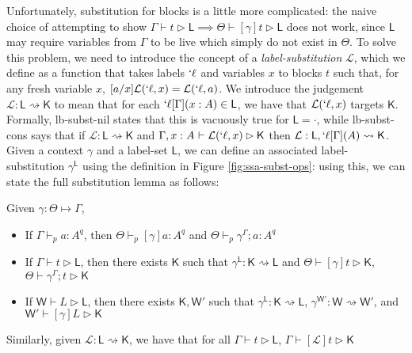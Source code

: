 \documentclass[acmsmall,screen,review]{acmart}
\newcommand{\mc}[1]{\ensuremath{\mathcal{#1}}}
\newcommand{\ms}[1]{\ensuremath{\mathsf{#1}}}
\newcommand{\lbl}[1]{{`#1}}
\newcommand{\thyp}[3]{#1: {#2}^{#3}}
\newcommand{\lhyp}[3]{#1[#2](#3)}
\newcommand{\rle}[1]{{\scriptsize\textsf{#1}}}
\newcommand{\hasty}[5]{#1 \vdash_{#2} #3: {#4}^{#5}}
\newcommand{\haslb}[3]{#1 \vdash #2 \rhd #3}
\newcommand{\lhaslb}[3]{#1 \vdash #2 \rhd #3}
\newcommand{\issubst}[3]{#1: #2 \mapsto #3}
\newcommand{\lbsubst}[3]{#1: #2 \rightsquigarrow #3}
\newcommand{\exprletsubst}[2]{{#1};{#2}}
\newcommand{\stmtletsubst}[2]{{#1};{#2}}
\newcommand{\substctx}[2]{{#1}^{#2}}
\newcommand{\substlbs}[2]{{#1}^{#2}}
\begin{document}
Unfortunately, substitution for blocks is a little more complicated: the naive
choice of attempting to show \(\haslb{\Gamma}{t}{\ms{L}} \implies
\haslb{\Theta}{[\gamma]t}{\ms{L}}\) does not work, since \(\ms{L}\) may require
variables from \(\Gamma\) to be live which simply do not exist in \(\Theta\). To
solve this problem, we need to introduce the concept of a
\textit{label-substitution} \(\mc{L}\), which we define as a function that takes
labels \(\lbl{\ell}\) and variables \(x\) to blocks \(t\) such that, for any
fresh variable \(x\), \([a/x]\mc{L}(\lbl{\ell}, x) = \mc{L}(\lbl{\ell}, a)\). We
introduce the judgement \(\lbsubst{\mc{L}}{\ms{L}}{\ms{K}}\) to mean that for
each \(\lbl{\ell}[\Gamma](x: A) \in \ms{L}\), we have that \(\mc{L}(\lbl{\ell},
x)\) targets \(\ms{K}\). Formally, \rle{lb-subst-nil} states that this is
vacuously true for \(\ms{L} = \cdot\), while \rle{lb-subst-cons} says that if
\(\lbsubst{\mc{L}}{\ms{L}}{\ms{K}}\) and \(\haslb{\Gamma,
\thyp{x}{A}{}}{\mc{L}(\lbl{\ell}, x)}{\ms{K}}\) then \(\lbsubst{\mc{L}}{\ms{L},
\lhyp{\lbl{\ell}}{\Gamma}{A}}{\ms{K}}\). Given a context \(\gamma\) and a
label-set \(\ms{L}\), we can define an associated label-substitution
\(\substlbs{\gamma}{\ms{L}}\) using the definition in Figure
\ref{fig:ssa-subst-ops}: using this, we can state the full substitution lemma as
follows:
\begin{lemma}[Substitution] 
  Given \(\issubst{\gamma}{\Theta}{\Gamma}\),
  \begin{itemize}
    \item If \(\hasty{\Gamma}{p}{a}{A}{q}\), then
    \(\hasty{\Theta}{p}{[\gamma]a}{A}{q}\) and
    \(\hasty{\Theta}{p}{\exprletsubst{\substctx{\gamma}{\Gamma}}{a}}{A}{q}\)
    \item If \(\haslb{\Gamma}{t}{\ms{L}}\), then there exists \(\ms{K}\) such
    that \(\lbsubst{\substlbs{\gamma}{\ms{L}}}{\ms{K}}{\ms{L}}\) and
    \(\haslb{\Theta}{[\gamma]t}{\ms{K}}\),
    \(\haslb{\Theta}{\stmtletsubst{\substctx{\gamma}{\Gamma}}{t}}{\ms{K}}\)
    \item If \(\lhaslb{\ms{W}}{L}{\ms{L}}\), then there exists \(\ms{K},
    \ms{W}'\) such that \(\lbsubst{\substlbs{\gamma}{\ms{L}}}{\ms{K}}{\ms{L}}\),
    \(\lbsubst{\substlbs{\gamma}{\ms{W}'}}{\ms{W}}{\ms{W}'}\), and
    \(\lhaslb{\ms{W}'}{[\gamma]L}{\ms{K}}\)
  \end{itemize}
  Similarly, given \(\lbsubst{\mc{L}}{\ms{L}}{\ms{K}}\), we have that for all
  \(\haslb{\Gamma}{t}{\ms{L}}\), \(\haslb{\Gamma}{[\mc{L}]t}{\ms{K}}\)
\end{lemma}
\end{document}
